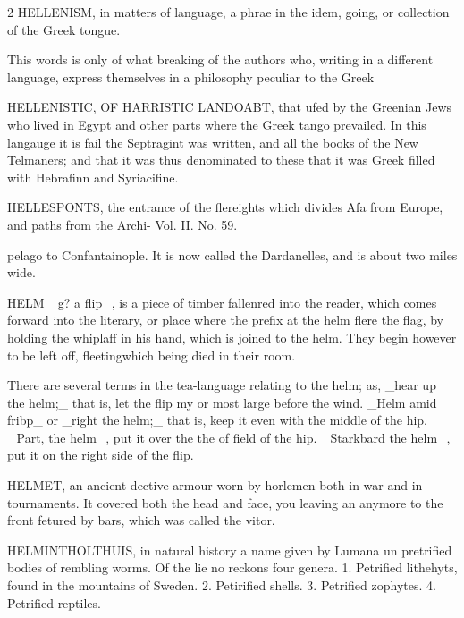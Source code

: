 \documentclass[10pt]{article}
\begin{document}
\begin{multicols}{2}
HELLENISM, in matters of language, a phrae in the idem, going, or collection of the Greek tongue.

This words is only of what breaking of the authors who, writing in a different language, express themselves in a philosophy peculiar to the Greek

HELLENISTIC, OF HARRISTIC LANDOABT, that ufed by the Greenian Jews who lived in Egypt and other parts where the Greek tango prevailed. In this langauge it is fail the Septragint was written, and all the books of the New Telmaners; and that it was thus denominated to these that it was Greek filled with Hebrafinn and Syriacifine.

HELLESPONTS, the entrance of the flereights which divides Afa from Europe, and paths from the Archi- Vol. II. No. 59.

pelago to Confantainople. It is now called the Dardanelles, and is about two miles wide.

HELM \_g? a flip\_, is a piece of timber fallenred into the reader, which comes forward into the literary, or place where the prefix at the helm flere the flag, by holding the whiplaff in his hand, which is joined to the helm. They begin however to be left off, fleetingwhich being died in their room.

There are several terms in the tea-language relating to the helm; as, \_hear up the helm;\_ that is, let the flip my or most large before the wind. \_Helm amid fribp\_ or \_right the helm;\_ that is, keep it even with the middle of the hip. \_Part, the helm\_, put it over the the of field of the hip. \_Starkbard the helm\_, put it on the right side of the flip.

HELMET, an ancient dective armour worn by horlemen both in war and in tournaments. It covered both the head and face, you leaving an anymore to the front fetured by bars, which was called the vitor.

HELMINTHOLTHUIS, in natural history a name given by Lumana un pretrified bodies of rembling worms. Of the lie no reckons four genera. 1. Petrified lithehyts, found in the mountains of Sweden. 2. Petirified shells. 3. Petrified zophytes. 4. Petrified reptiles.


\end{multicols}
\end{document}
